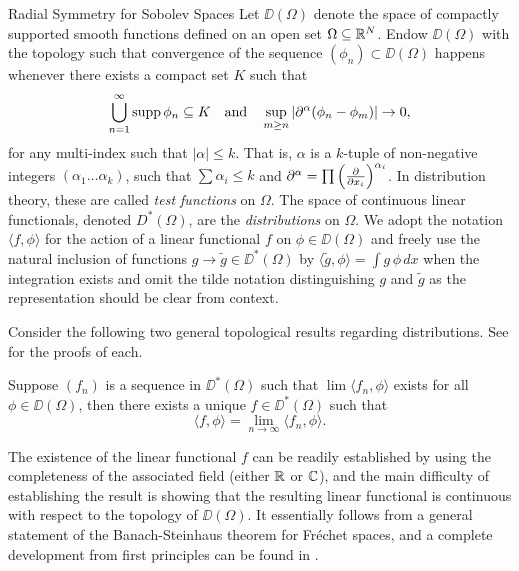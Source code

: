 \begin{chapter}{Radial Symmetry for Sobolev Spaces}
Let $\DD(\Omega)$ denote the space of compactly supported smooth functions defined on an open set $\Omega \subseteq \mathbb R^N$.
Endow $\DD(\Omega)$ with the topology such that convergence of the sequence $(\phi_n)\subset \DD(\Omega)$ happens whenever there exists a compact set $K$ such that 
\begin{equation}
  \bigcup_{n=1}^\infty \operatorname*{supp} \phi_n \subseteq K \quad\text{and}\quad
  \sup_{m\ge n} \left|\partial^\alpha (\phi_n-\phi_m)\right|\to 0, \label{eq:testFunctionContinuity}
\end{equation} 
for any multi-index such that $|\alpha|\le k$.
That is,  $\alpha$ is a $k$-tuple of non-negative integers $(\alpha_1\dots \alpha_k)$, such that $\sum \alpha_i \le k$ and $\partial^\alpha = \prod \left(\frac{\partial}{\partial x_i}\right)^{\alpha_i}$.
In distribution theory, these are called \emph{test functions} on $\Omega$.
The space of continuous linear functionals, denoted $D^*(\Omega)$, are the \emph{distributions} on $\Omega$.
We adopt the notation $\langle f, \phi\rangle$ for the action of a linear functional $f$ on $\phi \in \DD(\Omega)$ and freely use the natural inclusion of functions $g \to \tilde g \in \DD^*(\Omega)$ by $\langle \tilde g, \phi \rangle = \int g\, \phi\,dx$ when the integration exists and omit the tilde notation distinguishing $g$ and $\tilde g$ as the representation should be clear from context. 

Consider the following two general topological results regarding distributions. 
See \citep[Chapter 2]{hormander1983} for the proofs of each.
\begin{thm} \label{thm:completeness}
  Suppose $(f_n)$ is a sequence in $\DD^*(\Omega)$ such that $\lim\langle f_n,\phi\rangle$ exists for all $\phi \in \DD(\Omega)$, then there exists a unique $f\in \DD^*(\Omega)$ such that
  \begin{equation}
    \langle f, \phi\rangle = \lim_{n\to\infty} \langle f_n, \phi \rangle.
  \end{equation}
\end{thm}
The existence of the linear functional $f$ can be readily established by using the completeness of the associated field (either $\mathbb R$ or $\mathbb C$), and the main difficulty of establishing the result is showing that the resulting linear functional is continuous with respect to the topology of $\DD(\Omega)$.
It essentially follows from a general statement of the Banach-Steinhaus theorem for Fr\'{e}chet spaces, and a complete development from first principles can be found in \citep{rudin1991}.


\end{chapter}

